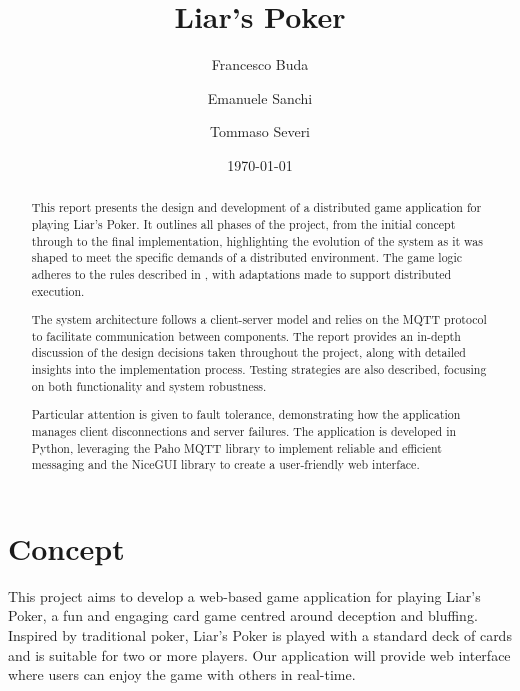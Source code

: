 \documentclass{scrartcl}
\title{\LARGE
    Liar's Poker
}
\author{
    Francesco Buda \\ \emailaddr{francesco.buda3@studio.unibo.it}
    \and
    Emanuele Sanchi \\ \emailaddr{emanuele.sanchi@studio.unibo.it}
    \and
    Tommaso Severi \\ \emailaddr{tommaso.severi2@studio.unibo.it}
}
\date{\today}
\begin{document}
\maketitle

\begin{abstract}
This report presents the design and development of a distributed game application for playing Liar's 
Poker. It outlines all phases of the project, from the initial concept through to the final 
implementation, highlighting the evolution of the system as it was shaped to meet the specific 
demands of a distributed environment. The game logic adheres to the rules described in 
\cite{gamerules}, with adaptations made to support distributed execution.

The system architecture follows a client-server model and relies on the MQTT protocol to facilitate 
communication between components. The report provides an in-depth discussion of the design decisions 
taken throughout the project, along with detailed insights into the implementation process. Testing 
strategies are also described, focusing on both functionality and system robustness.

Particular attention is given to fault tolerance, demonstrating how the application manages client 
disconnections and server failures. The application is developed in Python, leveraging the Paho MQTT 
library to implement reliable and efficient messaging and the NiceGUI library to create a 
user-friendly web interface.
\end{abstract}

\clearpage

\tableofcontents

\clearpage

\section{Concept}\label{concept}
This project aims to develop a web-based game application for playing Liar's Poker, a fun and engaging
card game centred around deception and bluffing. Inspired by traditional poker, Liar's Poker is played
with a standard deck of cards and is suitable for two or more players. Our application will provide web interface
where users can enjoy the game with others in real-time.
\end{document}
